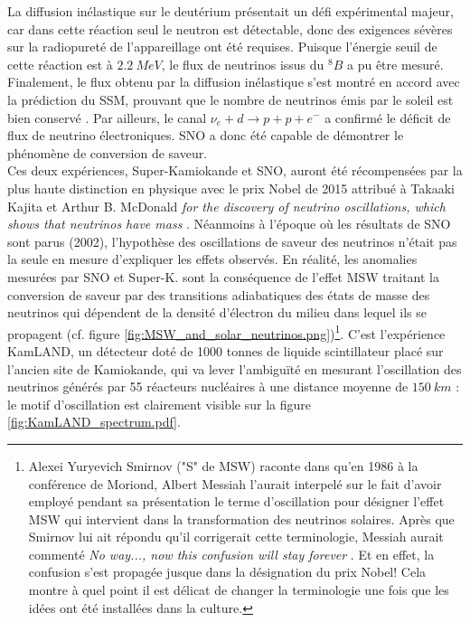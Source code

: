 
La diffusion inélastique sur le deutérium présentait un défi expérimental majeur, car dans cette réaction seul le neutron est détectable, donc des exigences sévères sur la radiopureté de l'appareillage ont été requises. Puisque l'énergie seuil de cette réaction est à $\SI{2,2}{MeV}$, le flux de neutrinos issus du $^{8}B$ a pu être mesuré. Finalement, le flux obtenu par la diffusion inélastique s'est montré en accord avec la prédiction du SSM, prouvant que le nombre de neutrinos émis par le soleil est bien conservé \cite{Aharmim:2011vm}. Par ailleurs, le canal $\nu_e + d \rightarrow p + p + e^-$ a confirmé le déficit de flux de neutrino électroniques. SNO a donc été capable de démontrer le phénomène de conversion de saveur.\\

Ces deux expériences, Super-Kamiokande et SNO, auront été récompensées par la plus haute distinction en physique avec le prix Nobel de 2015 attribué à Takaaki Kajita et Arthur B. McDonald \og \textit{for the discovery of neutrino oscillations, which shows that neutrinos have mass} \fg{}. Néanmoins à l'époque où les résultats de SNO sont parus (2002), l'hypothèse des oscillations de saveur des neutrinos n'était pas la seule en mesure d'expliquer les effets observés. En réalité, les anomalies mesurées par SNO et Super-K. sont la conséquence de l'effet MSW traitant la conversion de saveur par des transitions adiabatiques des états de masse des neutrinos qui dépendent de la densité d'électron du milieu dans lequel ils se propagent (cf. figure \ref{fig:MSW_and_solar_neutrinos.png})\footnote{Alexei Yuryevich Smirnov ("S" de MSW) raconte dans \cite{Smirnov:2016xzf} qu'en 1986 à la conférence de Moriond, Albert Messiah l'aurait interpelé sur le fait d'avoir employé pendant sa présentation le terme d'\og oscillation \fg{} pour désigner l'effet MSW qui intervient dans la transformation des neutrinos solaires. Après que Smirnov lui ait répondu qu'il corrigerait cette terminologie, Messiah aurait commenté \og \textit{No way..., now this confusion will stay forever} \fg{}. Et en effet, la confusion s'est propagée jusque dans la désignation du prix Nobel! Cela montre à quel point il est délicat de changer la terminologie une fois que les idées ont été installées dans la culture.}. C'est l'expérience KamLAND, un détecteur doté de 1000 tonnes de liquide scintillateur placé sur l'ancien site de Kamiokande, qui va lever l'ambiguïté en mesurant l'oscillation des neutrinos générés par 55 réacteurs nucléaires à une distance moyenne de $\SI{150}{km}$ \cite{Gando:2013nba} : le motif d'oscillation est clairement visible sur la figure \ref{fig:KamLAND_spectrum.pdf}.\\

